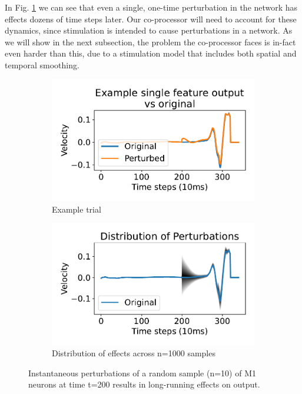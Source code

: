 \documentclass[12pt]{iopart}
\begin{document}
In Fig. \ref{fig:dynamics} we can see that even a single, one-time perturbation in
the network has effects dozens of time steps later. Our co-processor will need to
account for these dynamics, since stimulation is intended to cause perturbations
in a network. As we will show in the next subsection, the problem the co-processor faces
is in-fact even harder than this, due to a stimulation model that includes both
spatial and temporal smoothing.

\begin{figure}[h]
	\centering
	\begin{subfigure}[c]{0.48\textwidth}
	    \centering
	    \includegraphics[width=\textwidth]{perturbe_single.pdf}
	    \caption{Example trial}
	\end{subfigure}
	\hfill
	\begin{subfigure}[c]{0.48\textwidth}
	    \centering
	    \includegraphics[width=\textwidth]{perturbe_dist.pdf}
	    \caption{Distribution of effects across n=1000 samples}
	\end{subfigure}
	\hfill
	\caption{Instantaneous perturbations of a random sample (n=10) of M1
	         neurons at time t=200 results in long-running effects on output.}
	\label{fig:dynamics}
\end{figure}
\end{document}
